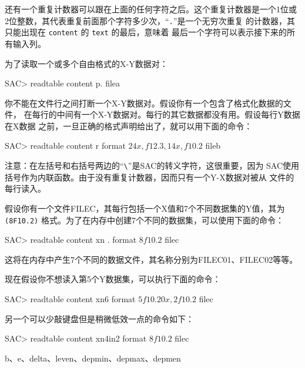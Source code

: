 还有一个重复计数器可以跟在上面的任何字符之后。这个重复计数器是一个1位或
2位整数，其代表重复前面那个字符多少次，``\texttt{.}''是一个无穷次重复
的计数器，其只能出现在 \texttt{content} 的 \texttt{text} 的最后，意味着
最后一个字符可以表示接下来的所有输入列。

为了读取一个或多个自由格式的X-Y数据对：
\begin{SACCode}
SAC> readtable content p. filea
\end{SACCode}

你不能在文件行之间打断一个X-Y数据对。假设你有一个包含了格式化数据的文件，
在每行的中间有一个X-Y数据对。每行的其它数据都没有用。假设每行Y数据在X数据
之前，一旦正确的格式声明给出了，就可以用下面的命令：
\begin{SACCode}
SAC> readtable content r format \(24x,f12.3,14x,f10.2\) fileb
\end{SACCode}
注意：在左括号和右括号两边的``\verb|\|''是SAC的转义字符，这很重要，因为
SAC使用括号作为内联函数。由于没有重复计数器，因而只有一个Y-X数据对被从
文件的每行读入。

假设你有一个文件FILEC，其每行包括一个X值和7个不同数据集的Y值，其为
\texttt{(8F10.2)} 格式。为了在内存中创建7个不同的数据集，可以使用下面的命令：
\begin{SACCode}
SAC> readtable content xn . format \(8f10.2\) filec
\end{SACCode}
这将在内存中产生7个不同的数据文件，其名称分别为FILEC01、FILEC02等等。

现在假设你不想读入第5个Y数据集，可以执行下面的命令：
\begin{SACCode}
SAC> readtable content xn6 format \(5f10.20x,2f10.2\) filec
\end{SACCode}
另一个可以少敲键盘但是稍微低效一点的命令如下：
\begin{SACCode}
SAC> readtable content xn4in2 format \(8f10.2\) filec
\end{SACCode}

b、e、delta、leven、depmin、depmax、depmen
